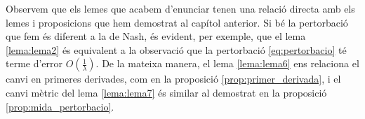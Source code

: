 \begin{obs}
    Observem que els lemes que acabem d'enunciar tenen una relació directa amb els lemes i proposicions que hem demostrat al capítol anterior. Si bé la pertorbació que fem és diferent a la de Nash, és evident, per exemple, que el lema \ref{lema:lema2} és equivalent a la observació que la pertorbació \eqref{eq:pertorbacio} té terme d'error $O\left(\frac{1}{\lambda}\right)$. De la mateixa manera, el lema \ref{lema:lema6} ens relaciona el canvi en primeres derivades, com en la proposició \ref{prop:primer_derivada}, i el canvi mètric del lema \ref{lema:lema7} és similar al demostrat en la proposició \ref{prop:mida_pertorbacio}.
\end{obs}



